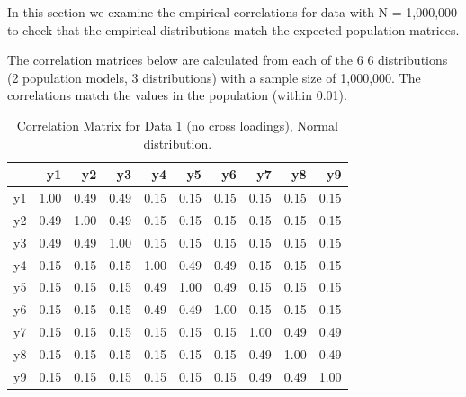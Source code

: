 \documentclass[
  letterpaper,
  DIV=11,
  numbers=noendperiod]{scrartcl}
\begin{document}
In this section we examine the empirical correlations for data with N =
1,000,000 to check that the empirical distributions match the expected
population matrices.

The correlation matrices below are calculated from each of the 6 6
distributions (2 population models, 3 distributions) with a sample size
of 1,000,000. The correlations match the values in the population
(within 0.01).

\begin{longtable}[]{@{}lrrrrrrrrr@{}}

\caption{\label{tbl-cors_data_1}Correlation Matrix for Data 1 (no cross
loadings), Normal distribution.}

\tabularnewline

\toprule\noalign{}
& y1 & y2 & y3 & y4 & y5 & y6 & y7 & y8 & y9 \\
\midrule\noalign{}
\endhead
\bottomrule\noalign{}
\endlastfoot
y1 & 1.00 & 0.49 & 0.49 & 0.15 & 0.15 & 0.15 & 0.15 & 0.15 & 0.15 \\
y2 & 0.49 & 1.00 & 0.49 & 0.15 & 0.15 & 0.15 & 0.15 & 0.15 & 0.15 \\
y3 & 0.49 & 0.49 & 1.00 & 0.15 & 0.15 & 0.15 & 0.15 & 0.15 & 0.15 \\
y4 & 0.15 & 0.15 & 0.15 & 1.00 & 0.49 & 0.49 & 0.15 & 0.15 & 0.15 \\
y5 & 0.15 & 0.15 & 0.15 & 0.49 & 1.00 & 0.49 & 0.15 & 0.15 & 0.15 \\
y6 & 0.15 & 0.15 & 0.15 & 0.49 & 0.49 & 1.00 & 0.15 & 0.15 & 0.15 \\
y7 & 0.15 & 0.15 & 0.15 & 0.15 & 0.15 & 0.15 & 1.00 & 0.49 & 0.49 \\
y8 & 0.15 & 0.15 & 0.15 & 0.15 & 0.15 & 0.15 & 0.49 & 1.00 & 0.49 \\
y9 & 0.15 & 0.15 & 0.15 & 0.15 & 0.15 & 0.15 & 0.49 & 0.49 & 1.00 \\

\end{longtable}
\end{document}
